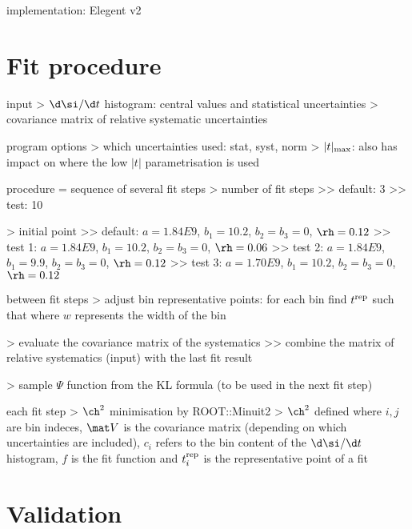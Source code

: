 \> implementation: Elegent v2


\chapter[fit]{Fit procedure}

\> input
\>> $\d\si/\d t$ histogram: central values and statistical uncertainties
\>> covariance matrix of relative systematic uncertainties

\> program options
\>> which uncertainties used: stat, syst, norm
\>> $|t|_{\rm max}$: also has impact on where the low $|t|$ parametrisation is used

\> procedure = sequence of several fit steps
\>> number of fit steps
\>>> default: 3
\>>> test: 10

\>> initial point
\>>> default: $a = 1.84E9$, $b_1 = 10.2$, $b_2 = b_3 = 0$, $\rh = 0.12$
\>>> test 1: $a = 1.84E9$, $b_1 = 10.2$, $b_2 = b_3 = 0$, $\rh = 0.06$
\>>> test 2: $a = 1.84E9$, $b_1 = 9.9$, $b_2 = b_3 = 0$, $\rh = 0.12$
\>>> test 3: $a = 1.70E9$, $b_1 = 10.2$, $b_2 = b_3 = 0$, $\rh = 0.12$

\> between fit steps
\>> adjust bin representative points: for each bin find $t^{\rm rep}$ such that
where $w$ represents the width of the bin

\>> evaluate the covariance matrix of the systematics
\>>> combine the matrix of relative systematics (input) with the last fit result

\>> sample $\Psi$ function from the KL formula (to be used in the next fit step)

\> each fit step
\>> $\ch^2$ minimisation by ROOT::Minuit2
\>> $\ch^2$ defined
where $i,j$ are bin indeces, $\mat V$ is the covariance matrix (depending on which uncertainties are included), $c_i$ refers to the bin content of the $\d\si/\d t$ histogram, $f$ is the fit function and $t^{\rm rep}_i$ is the representative point of a fit

%


\chapter{Validation}

